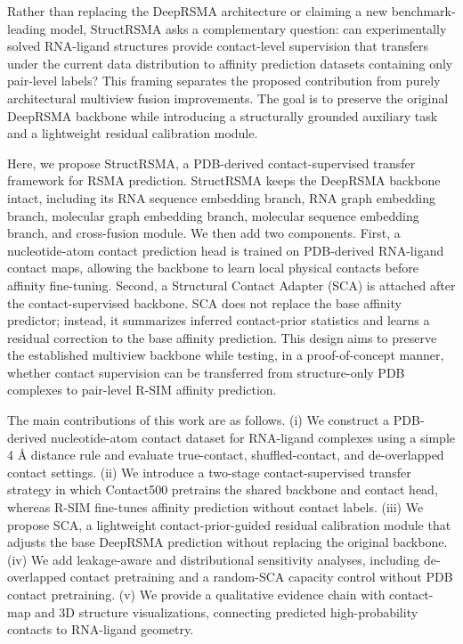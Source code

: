 \documentclass[journal=jcisd8,manuscript=article]{achemso}
\begin{document}
Rather than replacing the DeepRSMA architecture or claiming a new benchmark-leading model, StructRSMA asks a complementary question: can experimentally solved RNA-ligand structures provide contact-level supervision that transfers under the current data distribution to affinity prediction datasets containing only pair-level labels? This framing separates the proposed contribution from purely architectural multiview fusion improvements. The goal is to preserve the original DeepRSMA backbone while introducing a structurally grounded auxiliary task and a lightweight residual calibration module.

Here, we propose StructRSMA, a PDB-derived contact-supervised transfer framework for RSMA prediction. StructRSMA keeps the DeepRSMA backbone intact, including its RNA sequence embedding branch, RNA graph embedding branch, molecular graph embedding branch, molecular sequence embedding branch, and cross-fusion module. We then add two components. First, a nucleotide-atom contact prediction head is trained on PDB-derived RNA-ligand contact maps, allowing the backbone to learn local physical contacts before affinity fine-tuning. Second, a Structural Contact Adapter (SCA) is attached after the contact-supervised backbone. SCA does not replace the base affinity predictor; instead, it summarizes inferred contact-prior statistics and learns a residual correction to the base affinity prediction. This design aims to preserve the established multiview backbone while testing, in a proof-of-concept manner, whether contact supervision can be transferred from structure-only PDB complexes to pair-level R-SIM affinity prediction.

The main contributions of this work are as follows. (i) We construct a PDB-derived nucleotide-atom contact dataset for RNA-ligand complexes using a simple 4 \AA{} distance rule and evaluate true-contact, shuffled-contact, and de-overlapped contact settings. (ii) We introduce a two-stage contact-supervised transfer strategy in which Contact500 pretrains the shared backbone and contact head, whereas R-SIM fine-tunes affinity prediction without contact labels. (iii) We propose SCA, a lightweight contact-prior-guided residual calibration module that adjusts the base DeepRSMA prediction without replacing the original backbone. (iv) We add leakage-aware and distributional sensitivity analyses, including de-overlapped contact pretraining and a random-SCA capacity control without PDB contact pretraining. (v) We provide a qualitative evidence chain with contact-map and 3D structure visualizations, connecting predicted high-probability contacts to RNA-ligand geometry.
\end{document}
